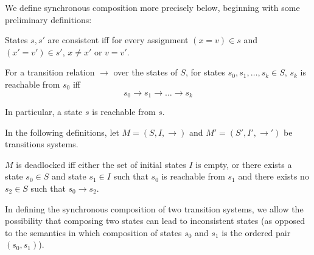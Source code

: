 \documentclass{llncs/llncs}
\begin{document}
We define synchronous composition more precisely below, beginning with some preliminary definitions:

\begin{definition}
  States $s, s'$ are consistent iff for every assignment $(x = v) \in s$ and $(x' =
  v') \in s'$, $x \neq x'$ or $v = v'$.
\end{definition}

\begin{definition}
For a transition relation $\rightarrow$ over the states of $S$, for states $s_0, s_1, \ldots, s_k \in S$, $s_k$ is reachable from $s_0$ iff
$$s_0 \rightarrow s_1 \rightarrow \ldots \rightarrow s_k$$
\end{definition}
\noindent
In particular, a state $s$ is reachable from $s$.

In the following definitions, let
$M = (S, I, \rightarrow)$
and
$M' = (S', I', \rightarrow')$
be transitions systems.

\begin{definition}[Deadlock]
$M$ is deadlocked iff either the set of initial states $I$ is empty, or there exists a state $s_0 \in S$ and state $s_1 \in I$ such that $s_0$ is reachable from $s_1$ and there exists no $s_2 \in S$ such that $s_0 \rightarrow s_2$.
\end{definition}


In defining the synchronous composition of two transition systems, we allow the possibility that composing two states can lead to inconsistent states (as opposed to the semantics in which composition of states $s_0$ and $s_1$ is the ordered pair $(s_0, s_1)$).
\end{document}
